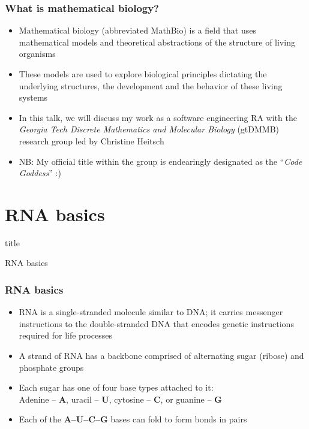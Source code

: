 \documentclass[usenames,svgnames,dvipsnames,11pt]{beamer}
\newcommand{\TitleBoxed}[1]{
     \begin{beamercolorbox}[sep=8pt,center,shadow=true,rounded=true]{title}
          \usebeamerfont{title}#1\par%
     \end{beamercolorbox}
}
\begin{document}
\begin{frame}
\frametitle{What is mathematical biology?}
\begin{itemize} 

\item Mathematical biology (abbreviated MathBio) is a field that uses mathematical models and 
      theoretical abstractions of the structure of living organisms 
\item These models are used to explore biological principles dictating the underlying structures, 
      the development and the behavior of these living systems 
\item In this talk, we will discuss my work as a software engineering RA with the 
      \emph{Georgia Tech Discrete Mathematics and Molecular Biology} 
      (gtDMMB) research group led by Christine Heitsch 
\item NB: My official title within the group is endearingly designated as the ``\emph{Code Goddess}'' :)

\end{itemize}

\end{frame}

\section{RNA basics}

\begin{frame}
\TitleBoxed{
     \Huge{\centerline{RNA basics}}
}
\end{frame}

\begin{frame}
\frametitle{RNA basics}
\begin{itemize} 

\item RNA is a single-stranded molecule similar to DNA; it carries messenger instructions to the 
      double-stranded DNA 
      that encodes genetic instructions required for life processes 
\item A strand of RNA has a backbone comprised of alternating sugar (ribose) and phosphate groups 
\item Each sugar has one of four base types attached to it: \\ 
      Adenine -- \textbf{A}, uracil -- \textbf{U}, cytosine -- \textbf{C}, or guanine -- \textbf{G}
\item Each of the \textbf{A--U--C--G} bases can fold to form bonds in pairs 

\end{itemize}

\end{frame}
\end{document}
